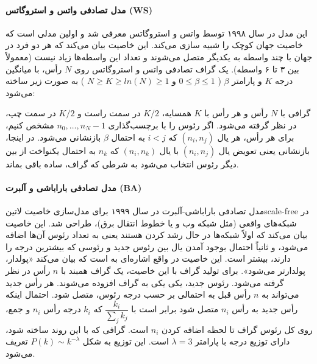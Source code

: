 \paragraph{مدل تصادفی واتس و استروگاتس (WS)}
این مدل در سال ۱۹۹۸ توسط واتس و استروگاتس معرفی شد و اولین مدلی است که خاصیت جهان کوچک را شبیه سازی می‌کند. این خاصیت بیان می‌کند که هر دو فرد در جهان با چند واسطه به یکدیگر متصل می‌شوند و تعداد این واسطه‌ها زیاد نیست (معمولاً بین ۳ تا ۶ واسطه). یک گراف تصادفی واتس و استروگاتس روی $N$ رأس، با میانگین درجه $K$ و پارامتر $\beta$ (
$0\leq \beta \leq 1$ و $N \geq K \geq ln(N) \geq 1$
) به صورت زیر ساخته می‌شود:
\begin{enumerate}
 گرافی با $N$ رأس و هر رأس با $K$ همسایه، $K/2$ در سمت راست و $K/2$ در سمت چپ، در نظر گرفته می‌شود.
 اگر رئوس را با برچسب‌گذاری $n_0,\ldots,n_N-1$ مشخص کنیم، برای هر رأس، هر یال $(n_i,n_j)$ که $i < j$ به احتمال $\beta$ بازنشانی می‌شود. در اینجا، بازنشانی یعنی تعویض یال $(n_i,n_j)$ با یال $(n_i,n_k)$ که $n_k$ به احتمال یکنواخت از بین دیگر رئوس انتخاب می‌شود به شرطی که گراف، ساده باقی بماند.
\end{enumerate}

\paragraph{مدل تصادفی باراباشی و آلبرت (BA)}
مدل تصادفی باراباشی-آلبرت در سال ۱۹۹۹ برای مدل‌سازی خاصیت ‌لاتین{scale-free} در شبکه‌های واقعی (مثل شبکه وب و یا خطوط انتقال برق)، طراحی شد. این خاصیت بیان می‌کند که اولاً شبکه‌ها در حال رشد کردن هستند یعنی به تعداد رئوس آن‌ها اضافه می‌شود، و ثانیاً احتمال بوجود آمدن یال بین رئوس جدید و رئوسی که بیشترین درجه را دارند، بیشتر است. این خاصیت در واقع اشاره‌ای به  است که بیان می‌کند «پولدار، پولدارتر می‌شود». برای تولید گراف با این خاصیت، یک گراف همبند با $n$ رأس در نظر گرفته می‌شود. رئوس جدید، یکی یکی به گراف افزوده می‌شوند. هر رأس جدید می‌تواند به $n$ رأس قبل به احتمالی بر حسب درجه رئوس، متصل شود. احتمال اینکه رأس جدید به رأس $n_i$ متصل شود برابر است با
$\dfrac{k_i}{\sum_jk_j}$ 
که $k_i$ درجه رأس $n_i$ و جمع، روی کل رئوس گراف تا لحظه اضافه کردن $n_i$ است. گرافی که با این روند ساخته شود، دارای توزیع درجه   با پارامتر $\lambda = 3$ است. این توزیع به شکل $P(k) \sim k^{-\lambda}$ تعریف می‌شود.

